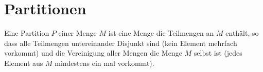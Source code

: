 \documentclass{article}
\begin{document}
\section{Partitionen}
Eine Partition $P$ einer Menge $M$ ist eine Menge die Teilmengen an $M$ enthält, so dass alle Teilmengen untereinander Disjunkt sind (kein Element mehrfach vorkommt) und die Vereinigung aller Mengen die Menge $M$ selbst ist (jedes Element aus $M$ mindestens ein mal vorkommt).
\end{document}
